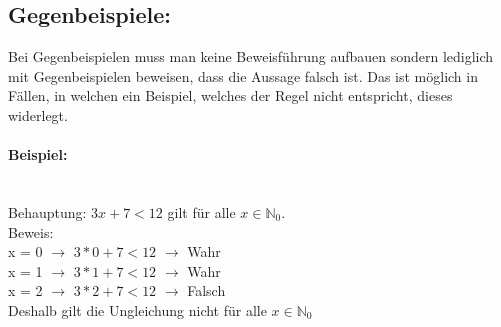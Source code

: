 \documentclass{article}
\newcommand{\paragraphlb}[1]{\paragraph{#1}\mbox{}\\}
\newcommand{\N}{\mathbb{N}}
\begin{document}
	\subsection{Gegenbeispiele:}
	Bei Gegenbeispielen muss man keine Beweisführung aufbauen sondern lediglich mit Gegenbeispielen beweisen, dass die Aussage falsch ist. Das ist möglich in Fällen, in welchen ein Beispiel, welches der Regel nicht entspricht, dieses widerlegt.
	\paragraphlb{Beispiel:}
	Behauptung: $3x+7<12$ gilt für alle $x\in\N_0$. \\
	Beweis: \\
	x = 0 $\to$ $3*0+7<12$ $\to$ Wahr \\
	x = 1 $\to$ $3*1+7<12$ $\to$ Wahr \\
	x = 2 $\to$ $3*2+7<12$ $\to$ Falsch \\
	Deshalb gilt die Ungleichung nicht für alle $x\in \N_0$
\end{document}
